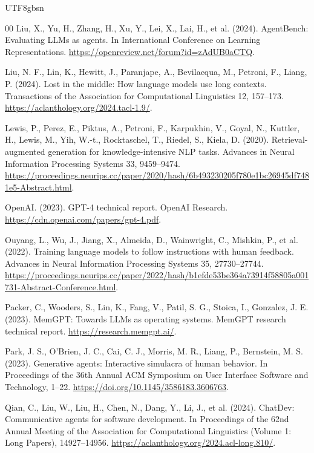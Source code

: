 \documentclass[a4paper,fleqn]{cas-sc}
\begin{document}
\begin{CJK*}{UTF8}{gbsn}
\begin{thebibliography}{00}
Liu, X., Yu, H., Zhang, H., Xu, Y., Lei, X., Lai, H., et al. (2024). AgentBench: Evaluating LLMs as agents. In International Conference on Learning Representations. \url{https://openreview.net/forum?id=zAdUB0aCTQ}.

Liu, N. F., Lin, K., Hewitt, J., Paranjape, A., Bevilacqua, M., Petroni, F., Liang, P. (2024). Lost in the middle: How language models use long contexts. Transactions of the Association for Computational Linguistics 12, 157--173. \url{https://aclanthology.org/2024.tacl-1.9/}.

Lewis, P., Perez, E., Piktus, A., Petroni, F., Karpukhin, V., Goyal, N., Kuttler, H., Lewis, M., Yih, W.-t., Rocktaschel, T., Riedel, S., Kiela, D. (2020). Retrieval-augmented generation for knowledge-intensive NLP tasks. Advances in Neural Information Processing Systems 33, 9459--9474. \url{https://proceedings.neurips.cc/paper/2020/hash/6b493230205f780e1bc26945df7481e5-Abstract.html}.

OpenAI. (2023). GPT-4 technical report. OpenAI Research. \url{https://cdn.openai.com/papers/gpt-4.pdf}.

Ouyang, L., Wu, J., Jiang, X., Almeida, D., Wainwright, C., Mishkin, P., et al. (2022). Training language models to follow instructions with human feedback. Advances in Neural Information Processing Systems 35, 27730--27744. \url{https://proceedings.neurips.cc/paper/2022/hash/b1efde53be364a73914f58805a001731-Abstract-Conference.html}.

Packer, C., Wooders, S., Lin, K., Fang, V., Patil, S. G., Stoica, I., Gonzalez, J. E. (2023). MemGPT: Towards LLMs as operating systems. MemGPT research technical report. \url{https://research.memgpt.ai/}.

Park, J. S., O'Brien, J. C., Cai, C. J., Morris, M. R., Liang, P., Bernstein, M. S. (2023). Generative agents: Interactive simulacra of human behavior. In Proceedings of the 36th Annual ACM Symposium on User Interface Software and Technology, 1--22. \url{https://doi.org/10.1145/3586183.3606763}.

Qian, C., Liu, W., Liu, H., Chen, N., Dang, Y., Li, J., et al. (2024). ChatDev: Communicative agents for software development. In Proceedings of the 62nd Annual Meeting of the Association for Computational Linguistics (Volume 1: Long Papers), 14927--14956. \url{https://aclanthology.org/2024.acl-long.810/}.


\end{thebibliography}
\end{CJK*}
\end{document}
